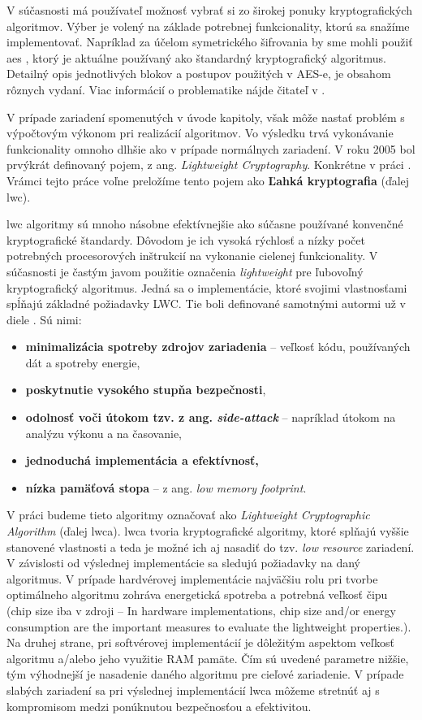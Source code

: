 V súčasnosti má používateľ možnosť vybrať si zo širokej ponuky kryptografických algoritmov. Výber je volený na základe potrebnej funkcionality, ktorú sa snažíme implementovať. Napríklad za účelom symetrického šifrovania by sme mohli použiť \acrshort{aes} \cite{aes}, ktorý je aktuálne používaný ako štandardný kryptografický algoritmus. Detailný opis jednotlivých blokov a postupov použitých v AES-e, je obsahom rôznych vydaní. Viac informácií o problematike nájde čitateľ v \cite{levicky}.

V prípade zariadení spomenutých v úvode kapitoly, však môže nastať problém s výpočtovým výkonom pri realizácií algoritmov. Vo výsledku trvá vykonávanie funkcionality omnoho dlhšie ako v prípade normálnych zariadení. V roku 2005 bol prvýkrát definovaný pojem, z ang. \textit{Lightweight Cryptography}. Konkrétne v práci \cite{lwc}. Vrámci tejto práce voľne preložíme tento pojem ako \textbf{Ľahká kryptografia} (ďalej \acrshort{lwc}). 

\acrshort{lwc} algoritmy sú mnoho násobne efektívnejšie ako súčasne používané konvenčné kryptografické štandardy. Dôvodom je ich vysoká rýchlosť a nízky počet potrebných procesorových inštrukcií na vykonanie cielenej funkcionality. V súčasnosti je častým javom použitie označenia \textit{lightweight} pre ľubovoľný kryptografický algoritmus. Jedná sa o implementácie, ktoré svojimi vlastnosťami spĺňajú základné požiadavky LWC. Tie boli definované samotnými autormi už v diele \cite{lwc}. Sú nimi: 
\begin{itemize}
	\item{\textbf{minimalizácia spotreby zdrojov zariadenia}} -- veľkosť kódu, používaných dát a spotreby energie,
	\item{\textbf{poskytnutie vysokého stupňa bezpečnosti}},
	\item{\textbf{odolnosť voči útokom tzv. z ang. \textit{side-attack}}} -- napríklad útokom na analýzu výkonu a na časovanie, 
	\item{\textbf{jednoduchá implementácia a efektívnosť,}}
	\item{\textbf{nízka pamäťová stopa}} -- z ang. \textit{low memory footprint}.
\end{itemize}

V práci budeme tieto algoritmy označovať ako \textit{Lightweight Cryptographic Algorithm} (ďalej \acrshort{lwca}).
\acrshort{lwca} tvoria kryptografické algoritmy, ktoré splňajú vyššie stanovené vlastnosti a teda je možné ich aj nasadiť do tzv. \textit{low resource} zariadení. V závislosti od výslednej implementácie sa sledujú požiadavky na daný algoritmus. V prípade hardvérovej implementácie najväčšiu rolu pri tvorbe optimálneho algoritmu zohráva energetická spotreba a potrebná veľkosť čipu (chip size iba v zdroji -- In hardware implementations, chip size and/or energy
consumption are the important measures to evaluate the lightweight properties.). Na druhej strane, pri softvérovej implementácií je dôležitým aspektom veľkosť algoritmu a/alebo jeho využitie RAM pamäte. Čím sú uvedené parametre nižšie, tým výhodnejší je nasadenie daného algoritmu pre cieľové zariadenie. V prípade slabých zariadení sa pri výslednej implementácií \acrshort{lwca} môžeme stretnúť aj s kompromisom medzi ponúknutou bezpečnosťou a efektivitou.

